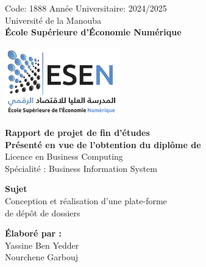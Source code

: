 \begin{titlepage}
\thispagestyle{empty}

\centering
\vspace*{1cm} %

{\large Code: 1888 \hspace{6cm} Année Universitaire: 2024/2025} \\
\vspace{1cm}
{\Large Université de la Manouba}\\
\vspace{0.2cm}
{\Large \textbf{École Supérieure d'Économie Numérique}}\\
\vspace{0.5cm}

\includegraphics[width=5cm]{figures/logo.png} \\  %

\vspace{0.5cm}

{\LARGE\textbf{Rapport de projet de fin d'études}} \\[0.5cm]

{\large \textbf{Présenté en vue de l'obtention du diplôme de}} \\
{\large Licence en Business Computing} \\
{\large Spécialité : Business Information System} \\
\vspace{0.8cm}

{\large \textbf{Sujet}} \\[0.3cm]
{\LARGE Conception et réalisation d'une plate-forme\\ de dépôt de dossiers} \\
\vspace{0.8cm}

{\large \textbf{Élaboré par :}} \\
{\large Yassine Ben Yedder} \\
{\large Nourchene Garbouj} \\
\vspace{0.8cm}


\end{titlepage}
